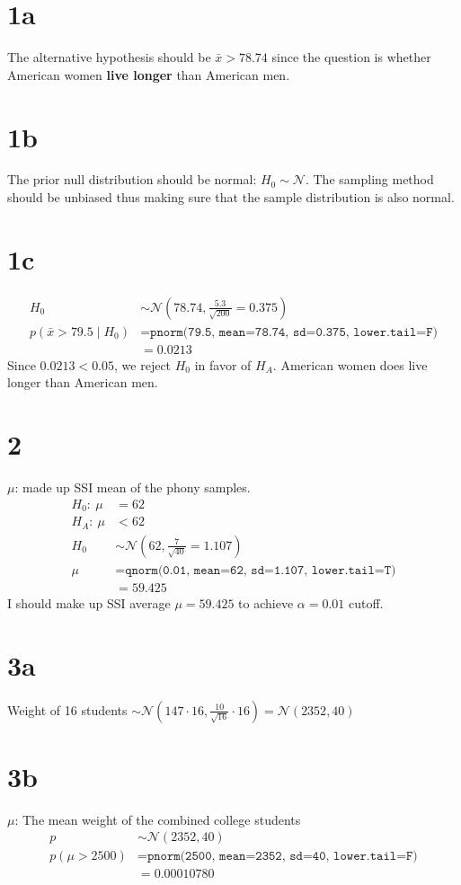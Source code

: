 \documentclass{article}
\begin{document}
\section*{1a}
The alternative hypothesis should be $\bar{x} > 78.74$ since the question is
whether American women \textbf{live longer} than American men.

\section*{1b}
The prior null distribution should be normal: $H_0 \sim \mathcal{N}$. The
sampling method should be unbiased thus making sure that the sample distribution
is also normal.

\section*{1c}
\begin{align*}
H_0 &\sim \mathcal{N}(78.74, \frac{5.3}{\sqrt{200}} = 0.375)\\
p(\bar{x} > 79.5 \mid H_0) &= \texttt{pnorm(79.5, mean=78.74, sd=0.375,
																			lower.tail=F)}\\
													 &= 0.0213
\end{align*}
Since $0.0213 < 0.05$, we reject $H_0$ in favor of $H_A$. American women does
live longer than American men.

\section*{2}
$\mu$: made up SSI mean of the phony samples.
\begin{align*}
	H_0:\ \mu &= 62\\
	H_A:\ \mu &< 62\\
	H_0 &\sim \mathcal{N}(62, \frac{7}{\sqrt{40}}=1.107)\\
	\mu &= \texttt{qnorm(0.01, mean=62, sd=1.107, lower.tail=T)}\\
			&= 59.425
\end{align*}
I should make up SSI average $\mu=59.425$ to achieve $\alpha = 0.01$ cutoff.

\section*{3a}
Weight of 16 students $\sim \mathcal{N}(147 \cdot 16,
\frac{10}{\sqrt{16}}\cdot 16) = \mathcal{N}(2352, 40)$

\section*{3b}
$\mu$: The mean weight of the combined college students
\begin{align*}
p &\sim \mathcal{N}(2352, 40)\\
p(\mu > 2500) &= \texttt{pnorm(2500, mean=2352, sd=40, lower.tail=F)}\\
							&= 0.00010780
\end{align*}
\end{document}
